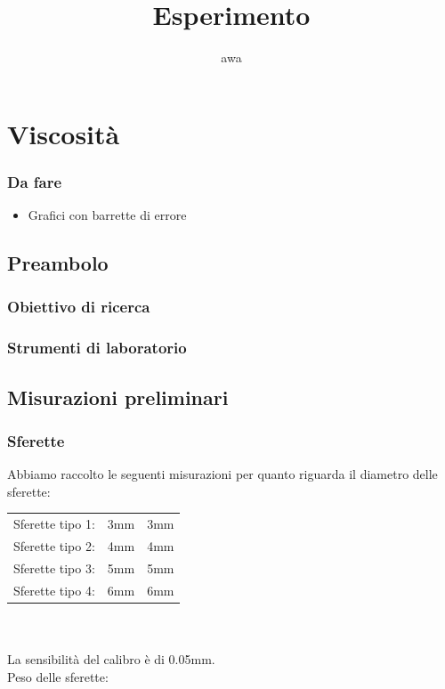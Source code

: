 \documentclass[a4paper,10pt]{report}
\author{awa}
\title{Esperimento}
\begin{document}
\maketitle

\chapter{Viscosità}

\subsection{Da fare}
\begin{itemize}
 \item Grafici con barrette di errore
\end{itemize}

\section{Preambolo}
\subsection{Obiettivo di ricerca}
\subsection{Strumenti di laboratorio}

\section{Misurazioni preliminari}
\subsection{Sferette}
Abbiamo raccolto le seguenti misurazioni per quanto riguarda il diametro delle sferette:
\\

\begin{tabular}{|l|l|l|}
 \toprule
 Sferette tipo 1: & 3mm & 3mm \\
 Sferette tipo 2: & 4mm & 4mm \\
 Sferette tipo 3: & 5mm & 5mm \\
 Sferette tipo 4: & 6mm & 6mm \\
 \bottomrule
\end{tabular}
\\
\\
La sensibilità del calibro è di 0.05mm.\\
Peso delle sferette:
\\
\end{document}
